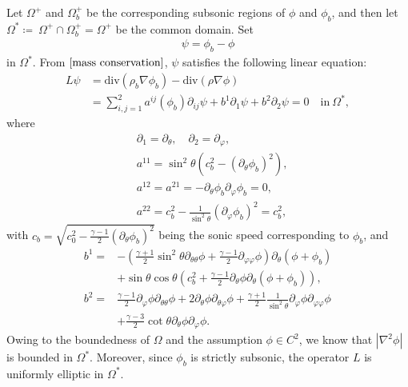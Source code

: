 \documentclass[reqno,12pt]{amsart}
\newcommand{\di}{\mathrm{div}}
\numberwithin{equation}{section}
\begin{document}
Let $\Omega^+ $ and $\Omega^{+}_{b}$ be the corresponding subsonic regions of $\phi$ and $\phi_b$, and then let $\Omega^{*}\coloneqq ~\Omega^+ \cap \Omega^{+}_{b}= \Omega^+$ be the common domain. Set
		\begin{align*}
		\psi=\phi_b-\phi
	\end{align*}
in $\Omega^*$. From $\eqref{mass conservation}$, $\psi$ satisfies the following linear equation:
	\begin{align}
		L\psi&=\di (\rho_b\nabla \phi_b)-\di(\rho\nabla \phi)\nonumber\\
		&=\sum_{i,j=1}^{2}a^{ij}(\phi_b)\partial_{ij}\psi +b^1\partial_1\psi +b^2\partial_2\psi=0\quad\text{in}~\Omega^*,
	\end{align}
where
	\begin{align*}
	&\partial_1=\partial_\theta, \quad \partial_2=\partial_\varphi,\\
	&a^{11}=\sin^2\theta(c_b^2-(\partial_{\theta}\phi_b)^2),\\
	&a^{12}=a^{21}=-\partial_\theta\phi_b\partial_\varphi\phi_b=0,\\
	&a^{22}=c_b^2-\frac{1}{\sin^2\theta}(\partial_\varphi\phi_b)^2=c^2_b,
	\end{align*}
with $c_b=\sqrt{c^2_0-\frac{\gamma-1}{2}(\partial_{\theta}\phi_b)^2}$ being the sonic speed corresponding to $\phi_b$, and
\begin{align}
  b^{1}= & -\left(\frac{\gamma+1}{2} \sin^{2}\theta  \partial_{\theta \theta} \phi+\frac{\gamma-1}{2} \partial_{\varphi \varphi} \phi\right) \partial_{\theta}\left(\phi+\phi_{b}\right) \nonumber\\& +\sin\theta \cos \theta \left(c_{b}^{2}+\frac{\gamma-1}{2} \partial_{\theta} \phi \partial_{\theta}\left(\phi+\phi_{b}\right)\right), \\
  b^{2}= & \frac{\gamma-1}{2} \partial_{\varphi} \phi \partial_{\theta\theta} \phi+2 \partial_{\theta} \phi \partial_{\theta\varphi} \phi+\frac{\gamma+1}{2} \frac{1}{\sin^{2}\theta} \partial_{\varphi} \phi \partial_{\varphi\varphi} \phi \nonumber\\& +\frac{\gamma-3}{2} \cot\theta \partial_{\theta} \phi \partial_{\varphi} \phi .
\end{align}
Owing to the boundedness of $\Omega$ and the assumption $\phi \in C^2$, we know that $|\nabla^2\phi|$ is bounded in $\Omega^*$. Moreover, since $\phi_b$ is strictly subsonic, the operator $L$ is uniformly elliptic in $\Omega^*$.
\end{document}
